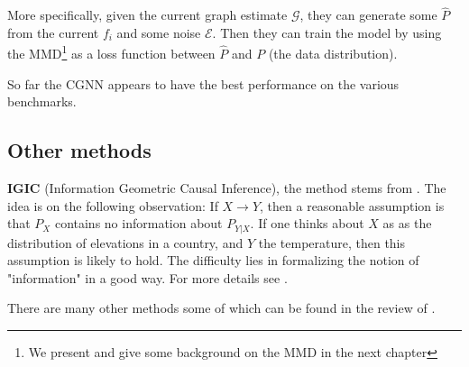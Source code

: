 More specifically, given the current graph estimate $\mathcal{G}$, they can generate some $\hat{P}$
from the current $f_i$ and some noise $\mathcal{E}$. Then they can train the model by using 
the MMD\footnote{We present and give some background on the MMD in the next chapter} 
as a loss function between $\hat{P}$ and $P$ (the data distribution).

So far the CGNN appears to have the best performance on the various benchmarks. 

\subsection{Other methods}



\textbf{IGIC} (Information Geometric Causal Inference), the method stems from \cite{janzing2010causal}.  
The idea is on the following observation: If $X \rightarrow Y$, then a reasonable assumption is that 
$P_X$ contains no information about $P_{Y | X}$. If one thinks about $X$ as as the distribution of 
elevations in a country, and $Y$ the temperature, then this assumption is likely to hold. The difficulty 
lies in formalizing the notion of "information" in a good way. For more details see \cite{Mooij2016jmlr}.

There are many other methods some of which can be found in the review of \cite{Mooij2016jmlr}.






